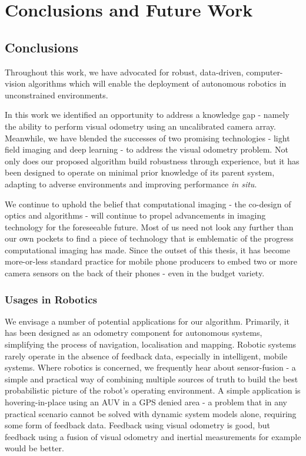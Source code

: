 \chapter{Conclusions and Future Work}


\section{Conclusions}
Throughout this work, we have advocated for robust, data-driven, computer-vision algorithms which will enable the deployment of autonomous robotics in unconstrained environments. 

In this work we identified an opportunity to address a knowledge gap - namely the ability to perform visual odometry using an uncalibrated camera array. Meanwhile, we have blended the successes of two promising technologies - light field imaging and deep learning - to address the visual odometry problem.  Not only does our proposed algorithm build robustness through experience, but it has been designed to operate on minimal prior knowledge of its parent system, adapting to adverse environments and improving performance \textit{in situ}. 

We continue to uphold the belief that computational imaging - the co-design of optics and algorithms - will continue to propel advancements in imaging technology for the foreseeable future. Most of us need not look any further than our own pockets to find a piece of technology that is emblematic of the progress computational imaging has made. Since the outset of this thesis, it has become more-or-less standard practice for mobile phone producers to embed two or more camera sensors on the back of their phones - even in the budget variety. 

\subsection{Usages in Robotics}
We envisage a number of potential applications for our algorithm. Primarily, it has been designed as an odometry component for autonomous systems, simplifying the process of navigation, localisation and mapping. Robotic systems rarely operate in the absence of feedback data, especially in intelligent, mobile systems. Where robotics is concerned, we frequently hear about sensor-fusion - a simple and practical way of combining multiple sources of truth to build the best probabilistic picture of the robot's operating environment. A simple application is hovering-in-place using an AUV in a GPS denied area - a problem that in any practical scenario cannot be solved with dynamic system models alone, requiring some form of feedback data. Feedback using visual odometry is good, but feedback using a fusion of visual odometry and inertial measurements for example would be better. 

